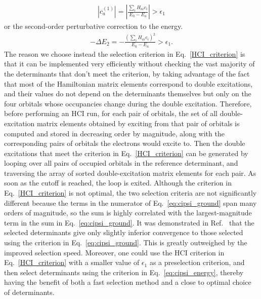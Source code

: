 \documentclass[%
reprint,
 superscriptaddress,
 amsmath,amssymb,
 aps,
]{revtex4-1}
\def\beq{\begin{eqnarray}}
\def\eeq{\end{eqnarray}}
\begin{document}
\beq
\left|c_a^{(1)}\right|=\left|\frac{\sum_i H_{ai}c_i}{E_0-E_a}\right| > \epsilon_1
\label{eq:cipsi_ground}
\eeq
or the second-order perturbative correction to the energy.
\beq
-\Delta E_2=-\frac{\left(\sum_i H_{ai}c_i\right)^2}{E_0-E_a} > \epsilon_1.
\label{eq:cipsi_energy}
\eeq
The reason we choose instead the selection criterion in Eq.~\ref{HCI_criterion} is that it can be implemented
very efficiently without checking the vast majority of the determinants that don't meet the criterion, by taking advantage
of the fact that %
most of the Hamiltonian matrix elements correspond to double excitations, and their values do not depend
on the determinants themselves but only on the four orbitals whose occupancies change during the double excitation.
Therefore, before performing an HCI run, for each pair of orbitals, the set of all double-excitation matrix elements
obtained by exciting from that pair of orbitals is computed and stored
in decreasing order by magnitude, along with the corresponding pairs of orbitals the electrons would excite to.
Then the double excitations that meet the criterion in Eq.~\ref{HCI_criterion} can be generated by
looping over all pairs of occupied orbitals in the reference determinant, and
traversing the array of sorted double-excitation matrix elements for each pair.
As soon as the cutoff is reached, the loop is exited.
Although the criterion in Eq.~\ref{HCI_criterion} is not optimal, the two selection criteria are not significantly different because
the terms in the numerator of Eq.~\ref{eq:cipsi_ground}
span many orders of magnitude, so the sum is highly correlated with the largest-magnitude term in the sum in Eq.~\ref{eq:cipsi_ground}.
It was demonstrated in Ref.~\cite{HolTubUmr-JCTC-16} that the selected determinants give only slightly inferior convergence
to those selected using the criterion in Eq.~\ref{eq:cipsi_ground}.  This is greatly outweighed by the improved selection speed.
Moreover, one could use the HCI criterion in Eq.~\ref{HCI_criterion} with a smaller value of $\epsilon_1$ as a preselection criterion, and then select determinants
using the criterion in Eq.~\ref{eq:cipsi_energy}, thereby having the benefit of both a fast selection method and a
close to optimal choice of determinants.
\end{document}
